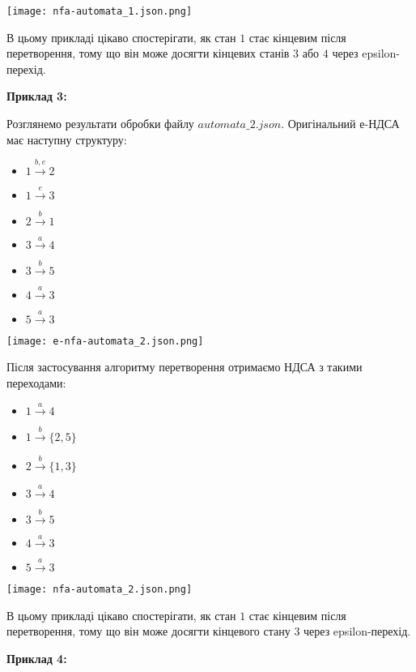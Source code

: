 \documentclass[12pt,a4paper]{article}
\begin{document}
\texttt{[image: nfa-automata\_1.json.png]}

В цьому прикладі цікаво спостерігати, як стан \(1\) стає кінцевим після перетворення, тому що він може досягти кінцевих станів \(3\) або \(4\) через epsilon-перехід.

\vspace{1em}
\textbf{Приклад 3:}
\vspace{0.5em}

Розглянемо результати обробки файлу \( automata\_2.json \). Оригінальний е-НДСА має наступну структуру:

\begin{itemize}
    \item \(1 \xrightarrow{b, e} 2\)
    \item \(1 \xrightarrow{e} 3\)
    \item \(2 \xrightarrow{b} 1\)
    \item \(3 \xrightarrow{a} 4\)
    \item \(3 \xrightarrow{b} 5\)
    \item \(4 \xrightarrow{a} 3\)
    \item \(5 \xrightarrow{a} 3\)
\end{itemize}

\texttt{[image: e-nfa-automata\_2.json.png]}

Після застосування алгоритму перетворення отримаємо НДСА з такими переходами:
\begin{itemize}
    \item \(1 \xrightarrow{a} 4\)
    \item \(1 \xrightarrow{b} \{2, 5\}\)
    \item \(2 \xrightarrow{b} \{1, 3\}\)
    \item \(3 \xrightarrow{a} 4\)
    \item \(3 \xrightarrow{b} 5\)
    \item \(4 \xrightarrow{a} 3\)
    \item \(5 \xrightarrow{a} 3\)
\end{itemize}

\texttt{[image: nfa-automata\_2.json.png]}

В цьому прикладі цікаво спостерігати, як стан \(1\) стає кінцевим після перетворення, тому що він може досягти кінцевого стану \(3\) через epsilon-перехід.

\vspace{1em}
\textbf{Приклад 4:}
\vspace{0.5em}
\end{document}
